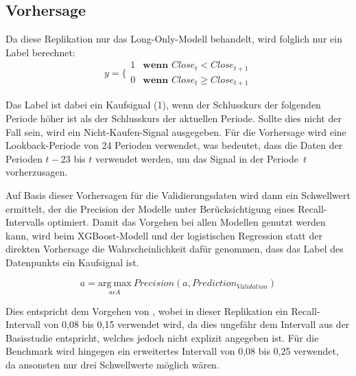 \documentclass[a4paper, 12pt]{article}
\begin{document}
\subsection{Vorhersage}
Da diese Replikation nur das Long-Only-Modell behandelt, wird folglich nur ein Label berechnet:
\[
y = \Biggl\{ 
\begin{array}{ll}
	1 &\textbf{wenn\ \ } Close_t < Close_{t+1} \\
	0 &\textbf{wenn\ \ } Close_t \geq Close_{t+1}
\end{array}
\]

Das Label ist dabei ein Kaufsignal (1), wenn der Schlusskurs der folgenden Periode höher ist als der Schlusskurs der aktuellen Periode.
Sollte dies nicht der Fall sein, wird ein Nicht-Kaufen-Signal ausgegeben.
Für die Vorhersage wird eine Lookback-Periode von 24 Perioden verwendet, was bedeutet, dass die Daten der Perioden $t-23$ bis $t$ verwendet werden, um das Signal in der Periode~$t$ vorherzusagen.

Auf Basis dieser Vorhersagen für die Validierungsdaten wird dann ein Schwellwert ermittelt, der die Precision der Modelle unter Berücksichtigung eines Recall-Intervalls optimiert.
Damit das Vorgehen bei allen Modellen genutzt werden kann, wird beim XGBoost-Modell und der logistischen Regression statt der direkten Vorhersage die Wahrscheinlichkeit dafür genommen, dass das Label des Datenpunkts ein Kaufsignal ist.

\begin{equation}
   a = \underset{a \epsilon A}{\mathrm{arg\ max}}\ Precision(a, Prediction_{Validation})
\end{equation}
 
Dies entspricht dem Vorgehen von \textcite{Goutte2023}, wobei in dieser Replikation ein Recall-Intervall von 0,08 bis 0,15 verwendet wird, da dies ungefähr dem Intervall aus der Basisstudie entspricht, welches jedoch nicht explizit angegeben ist.
Für die Benchmark wird hingegen ein erweitertes Intervall von 0,08 bis 0,25 verwendet, da ansonsten nur drei Schwellwerte möglich wären.
 
 
\end{document}
